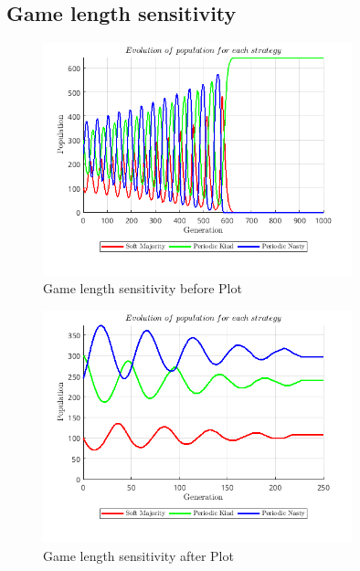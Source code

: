 \subsection{Game length sensitivity}
\begin{figure}[H]
    \centering
    \includegraphics[width=0.8\textwidth]{media/meetings/game_length_sensitivity_before.png}
    \caption{Game length sensitivity before Plot}
\end{figure}
\begin{figure}[H]
    \centering
    \includegraphics[width=0.8\textwidth]{media/meetings/game_length_sensitivity_after.png}
    \caption{Game length sensitivity after Plot}
\end{figure}

